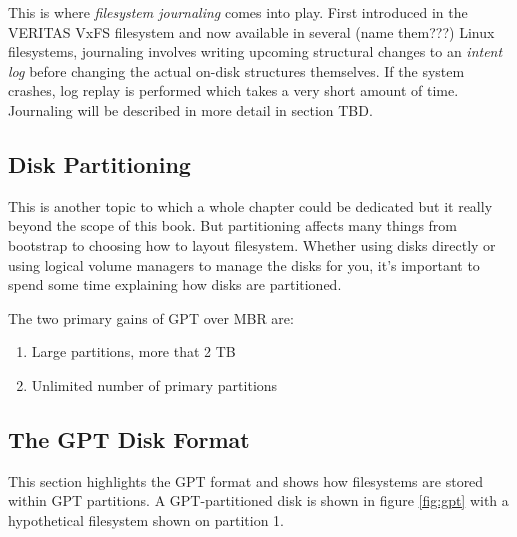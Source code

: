 This is where \textit{filesystem journaling} comes into play. First introduced in the VERITAS VxFS filesystem and now available in several (name them???) Linux filesystems, journaling involves writing upcoming structural changes to an \textit{intent log} before changing the actual on-disk structures themselves. If the system crashes, log replay is performed which takes a very short amount of time. Journaling will be described in more detail in section TBD.


\subsection{Disk Partitioning}

This is another topic to which a whole chapter could be dedicated but it really beyond the scope of this book. But partitioning affects many things from bootstrap to choosing how to layout filesystem. Whether using disks directly or using logical volume managers to manage the disks for you, it's important to spend some time explaining how disks are partitioned.

The two primary gains of GPT over MBR are:

\begin{enumerate}
	\item Large partitions, more that 2 TB
	\item Unlimited number of primary partitions
\end{enumerate}


\subsection{The GPT Disk Format}

This section highlights the GPT format and shows how filesystems are stored within GPT partitions. A GPT-partitioned disk is shown in figure \ref{fig:gpt} with a hypothetical filesystem shown on partition 1. 

